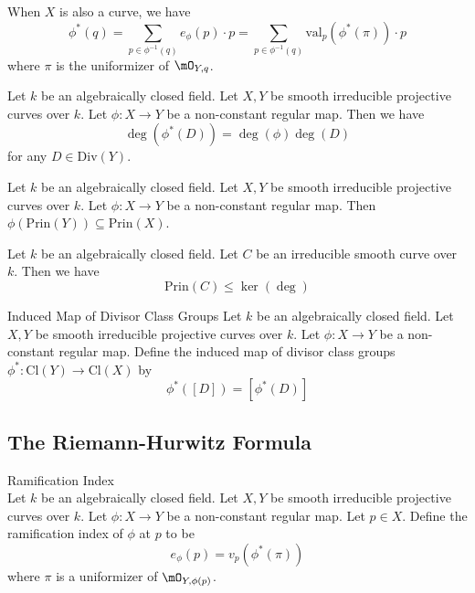 \documentclass[a4paper]{article}
\begin{document}
When $X$ is also a curve, we have $$\phi^\ast(q)=\sum_{p\in\phi^{-1}(q)}e_\phi(p)\cdot p=\sum_{p\in\phi^{-1}(q)}\text{val}_p(\phi^\ast(\pi))\cdot p$$ where $\pi$ is the uniformizer of $\mO_{Y,q}$. 

\begin{prp}{}{} Let $k$ be an algebraically closed field. Let $X,Y$ be smooth irreducible projective curves over $k$. Let $\phi:X\to Y$ be a non-constant regular map. Then we have $$\deg(\phi^\ast(D))=\deg(\phi)\deg(D)$$ for any $D\in\text{Div}(Y)$. 
\end{prp}

\begin{prp}{}{} Let $k$ be an algebraically closed field. Let $X,Y$ be smooth irreducible projective curves over $k$. Let $\phi:X\to Y$ be a non-constant regular map. Then $\phi(\text{Prin}(Y))\subseteq\text{Prin}(X)$. 
\end{prp}

\begin{prp}{}{} Let $k$ be an algebraically closed field. Let $C$ be an irreducible smooth curve over $k$. Then we have $$\text{Prin}(C)\leq\ker(\deg)$$
\end{prp}

\begin{defn}{Induced Map of Divisor Class Groups}{} Let $k$ be an algebraically closed field. Let $X,Y$ be smooth irreducible projective curves over $k$. Let $\phi:X\to Y$ be a non-constant regular map. Define the induced map of divisor class groups $\phi^\ast:\text{Cl}(Y)\to\text{Cl}(X)$ by $$\phi^\ast([D])=[\phi^\ast(D)]$$
\end{defn}

\subsection{The Riemann-Hurwitz Formula}
\begin{defn}{Ramification Index}{}\\
Let $k$ be an algebraically closed field. Let $X,Y$ be smooth irreducible projective curves over $k$. Let $\phi:X\to Y$ be a non-constant regular map. Let $p\in X$. Define the ramification index of $\phi$ at $p$ to be $$e_\phi(p)=v_p(\phi^\ast(\pi))$$ where $\pi$ is a uniformizer of $\mO_{Y,\phi(p)}$. 
\end{defn}
\end{document}
